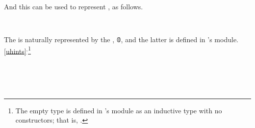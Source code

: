 \ccpad
And this can be used to represent , as follows.
\ccpad
\begin{code}
\>[0]\AgdaSpace{}%
\AgdaSymbol{:}\AgdaSpace{}%
\AgdaSymbol{\{}\AgdaSpace{}%
\AgdaSpace{}%
\AgdaSpace{}%
\AgdaSymbol{:}\AgdaSpace{}%
\AgdaSymbol{\}\{}\AgdaSpace{}%
\AgdaSymbol{:}\AgdaSpace{}%
\AgdaSpace{}%
\AgdaSymbol{\}}\AgdaSpace{}%
\AgdaSpace{}%
\AgdaSpace{}%
\AgdaSpace{}%
\AgdaSpace{}%
\AgdaSpace{}%
\AgdaSpace{}%
\AgdaSpace{}%
\AgdaSpace{}%
\AgdaSpace{}%
\AgdaSpace{}%
\AgdaSpace{}%
\AgdaSymbol{\AgdaUnderscore{}}\<%
\\
\>[0]\AgdaSpace{}%
\AgdaSpace{}%
\AgdaSpace{}%
\AgdaSymbol{=}\AgdaSpace{}%
\AgdaSpace{}%
\AgdaSpace{}%
\AgdaSpace{}%
\AgdaSpace{}%
\AgdaSpace{}%
\AgdaSpace{}%
\AgdaSpace{}%
\AgdaSpace{}%
\AgdaSpace{}%
\<%
\end{code}
\ccpad
The  is naturally represented by the , \af 𝟘, and the latter is defined in \typetopology's  module.\cref{uhints}$^, $\footnote{%
The empty type is defined in \typetopology's  module as an inductive type with no constructors; that is, \AgdaSpace{}%
\AgdaSpace{}%
\AgdaSymbol{\{}\AgdaSymbol{\}}\AgdaSpace{}%
\AgdaSymbol{:}\AgdaSpace{}%
\AgdaSpace{}%
\AgdaSpace{}%
\AgdaSpace{}%
.}
\ccpad
\begin{code}
\>[0]\AgdaSpace{}%
\AgdaSpace{}%
\AgdaSpace{}%
\AgdaSpace{}%
\AgdaSymbol{(}\AgdaSymbol{)}\<%
\\
%
\\[\AgdaEmptyExtraSkip]%
\>[0]\AgdaSpace{}%
\AgdaSymbol{:}\AgdaSpace{}%
\AgdaSymbol{\{}\AgdaSpace{}%
\AgdaSymbol{:}\AgdaSpace{}%
\AgdaSymbol{\}\{}\AgdaSpace{}%
\AgdaSymbol{:}\AgdaSpace{}%
\AgdaSpace{}%
\AgdaSymbol{\}}\AgdaSpace{}%
\AgdaSpace{}%
\AgdaSpace{}%
\AgdaSpace{}%
\<%
\\
\>[0]\AgdaSpace{}%
\AgdaSymbol{=}\AgdaSpace{}%
\AgdaSpace{}%
\AgdaBound{\AgdaUnderscore{}}\AgdaSpace{}%
\AgdaSpace{}%
\<%
\end{code}
